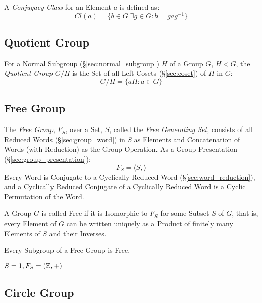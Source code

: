 A \emph{Conjugacy Class} for an Element $a$ is defined as:
\[
    Cl(a) = \{ b \in G | \exists g \in G : b = gag^{-1}\}
\]



\subsection{Quotient Group}\label{sec:quotient_group}

For a Normal Subgroup (\S\ref{sec:normal_subgroup}) $H$ of a Group
$G$, $H \triangleleft G$, the \emph{Quotient Group} $G/H$ is the Set
of all Left Cosets (\S\ref{sec:coset}) of $H$ in $G$:
\[
    G/H = \{ aH : a \in G \}
\]



\subsection{Free Group}\label{sec:free_group}

The \emph{Free Group}, $F_S$, over a Set, $S$, called the \emph{Free
  Generating Set}, consists of all Reduced Words
(\S\ref{sec:group_word}) in $S$ as Elements and Concatenation of Words
(with Reduction) as the Group Operation. As a Group Presentation
(\S\ref{sec:group_presentation}):
\[
    F_S = \langle S, \rangle
\]
Every Word is Conjugate to a Cyclically Reduced Word
(\S\ref{sec:word_reduction}), and a Cyclically Reduced Conjugate of a
Cyclically Reduced Word is a Cyclic Permutation of the Word.

A Group $G$ is called Free if it is Isomorphic to $F_S$ for some
Subset $S$ of $G$, that is, every Element of $G$ can be written
uniquely as a Product of finitely many Elements of $S$ and their
Inverses.

Every Subgroup of a Free Group is Free. \cite{hatcher02}

$S = {1}, F_S = (\mathbb{Z},+)$



\subsection{Circle Group}\label{sec:circle_group}

